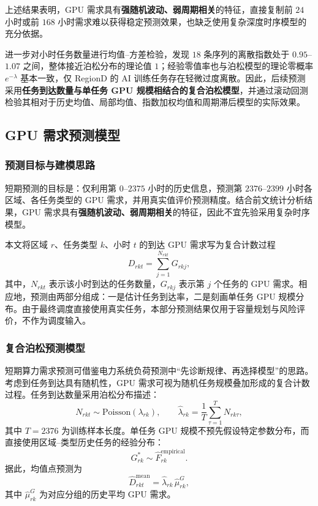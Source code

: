 \documentclass[UTF8,a4paper,zihao=-4]{ctexart}
\begin{document}
上述结果表明，GPU 需求具有\textbf{强随机波动、弱周期相关}的特征，直接复制前 $24$ 小时或前 $168$ 小时需求难以获得稳定预测效果，也缺乏使用复杂深度时序模型的充分依据。

进一步对小时任务数量进行均值--方差检验，发现 $18$ 条序列的离散指数处于 $0.95$--$1.07$ 之间，整体接近泊松分布的理论值 $1$；经验零值率也与泊松模型的理论零概率 $e^{-\lambda}$ 基本一致，仅 RegionD 的 AI 训练任务存在轻微过度离散。因此，后续预测采用\textbf{任务到达数量与单任务 GPU 规模相结合的复合泊松模型}，并通过滚动回测检验其相对于历史均值、局部均值、指数加权均值和周期滞后模型的实际效果。

\subsection{GPU 需求预测模型}
\label{sec:q1-forecast}

\subsubsection{预测目标与建模思路}

短期预测的目标是：仅利用第 $0$--$2375$ 小时的历史信息，预测第 $2376$--$2399$ 小时各区域、各任务类型的 GPU 需求，并用真实值评价预测精度。结合前文统计分析结果，GPU 需求具有\textbf{强随机波动、弱周期相关}的特征，因此不宜先验采用复杂时序模型。

本文将区域 $r$、任务类型 $k$、小时 $t$ 的到达 GPU 需求写为复合计数过程
\begin{equation}
D_{rkt}=\sum_{j=1}^{N_{rkt}}G_{rkj},
\end{equation}
其中，$N_{rkt}$ 表示该小时到达的任务数量，$G_{rkj}$ 表示第 $j$ 个任务的 GPU 需求。相应地，预测由两部分组成：一是估计任务到达率，二是刻画单任务 GPU 规模分布。由于最终调度直接使用真实任务，本部分预测结果仅用于容量规划与风险评价，不作为调度输入。

\subsubsection{复合泊松预测模型}

短期算力需求预测可借鉴电力系统负荷预测中“先诊断规律、再选择模型”的思路\cite{康重庆2004负荷预测}。考虑到任务到达具有随机性，GPU 需求可视为随机任务规模叠加形成的复合计数过程。任务到达数量采用泊松分布描述：
\begin{equation}
N_{rkt}\sim\mathrm{Poisson}(\lambda_{rk}),
\qquad
\widehat{\lambda}_{rk}=\frac{1}{T}\sum_{\tau=1}^{T}N_{rk\tau},
\end{equation}
其中 $T=2376$ 为训练样本长度。单任务 GPU 规模不预先假设特定参数分布，而直接使用区域--类型历史任务的经验分布：
\begin{equation}
G_{rk}^{*}\sim\widehat{F}_{rk}^{\mathrm{empirical}}.
\end{equation}
据此，均值点预测为
\begin{equation}
\widehat{D}_{rkt}^{\mathrm{mean}}=\widehat{\lambda}_{rk}\,\widehat{\mu}_{rk}^{G},
\end{equation}
其中 $\widehat{\mu}_{rk}^{G}$ 为对应分组的历史平均 GPU 需求。
\end{document}
